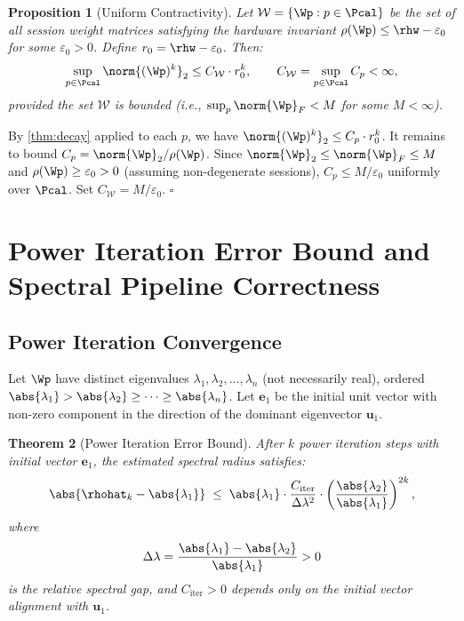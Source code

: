 \documentclass[12pt,letterpaper]{article}
\theoremstyle{plain}
\newtheorem{theorem}{Theorem}[section]
\newtheorem{proposition}[theorem]{Proposition}
\theoremstyle{definition}
\theoremstyle{remark}
\begin{document}
\begin{proposition}[Uniform Contractivity]
\label{prop:uniform}
Let \(\mathcal{W} = \{\Wp : p \in \Pcal\}\) be the set of all session weight
matrices satisfying the hardware invariant
\(\rho(\Wp) \leq \rhw - \varepsilon_0\) for some \(\varepsilon_0 > 0\).
Define \(r_0 = \rhw - \varepsilon_0\). Then:
\begin{equation}
  \sup_{p \in \Pcal} \norm{(\Wp)^k}_2 \leq C_{\mathcal{W}} \cdot r_0^k,
  \qquad
  C_{\mathcal{W}} = \sup_{p \in \Pcal} C_p < \infty,
  \label{eq:uniform}
\end{equation}
provided the set \(\mathcal{W}\) is bounded (i.e., \(\sup_p \norm{\Wp}_F < M\)
for some \(M < \infty\)).
\end{proposition}

\begin{proofbox}
By \cref{thm:decay} applied to each \(p\), we have
\(\norm{(\Wp)^k}_2 \leq C_p \cdot r_0^k\). It remains to bound
\(C_p = \norm{\Wp}_2 / \rho(\Wp)\). Since \(\norm{\Wp}_2 \leq \norm{\Wp}_F \leq M\)
and \(\rho(\Wp) \geq \varepsilon_0 > 0\) (assuming non-degenerate sessions),
\(C_p \leq M / \varepsilon_0\) uniformly over \(\Pcal\). Set
\(C_{\mathcal{W}} = M / \varepsilon_0\). \hfill\(\square\)
\end{proofbox}

\section{Power Iteration Error Bound and Spectral Pipeline Correctness}
\label{sec:poweriter}

\subsection{Power Iteration Convergence}

Let \(\Wp\) have distinct eigenvalues \(\lambda_1, \lambda_2, \ldots, \lambda_n\)
(not necessarily real), ordered \(\abs{\lambda_1} > \abs{\lambda_2} \geq \cdots \geq \abs{\lambda_n}\).
Let \(\mathbf{e}_1\) be the initial unit vector with non-zero component in the
direction of the dominant eigenvector \(\mathbf{u}_1\).

\begin{theorem}[Power Iteration Error Bound]
\label{thm:poweriter}
After \(k\) power iteration steps with initial vector \(\mathbf{e}_1\), the
estimated spectral radius satisfies:
\begin{equation}
  \abs{\rhohat_k - \abs{\lambda_1}}
  \;\leq\;
  \abs{\lambda_1} \cdot \frac{C_{\mathrm{iter}}}{\Delta\lambda^2}
  \cdot \left(\frac{\abs{\lambda_2}}{\abs{\lambda_1}}\right)^{2k},
  \label{eq:pibnd}
\end{equation}
where
\[
  \Delta\lambda = \frac{\abs{\lambda_1} - \abs{\lambda_2}}{\abs{\lambda_1}} > 0
\]
is the relative spectral gap, and \(C_{\mathrm{iter}} > 0\) depends only on
the initial vector alignment with \(\mathbf{u}_1\).
\end{theorem}
\end{document}
